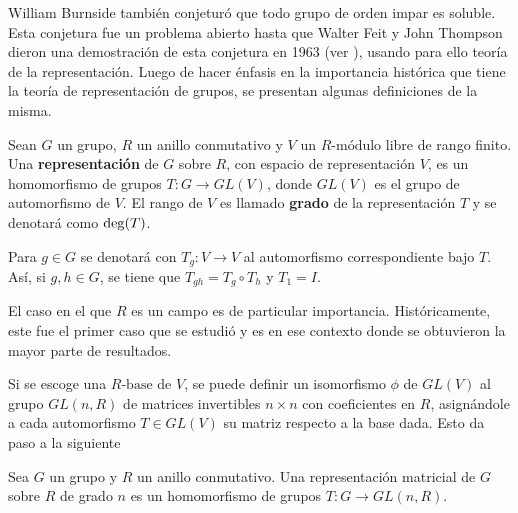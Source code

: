 William Burnside también conjeturó que todo grupo de orden impar es soluble. Esta conjetura fue un problema abierto hasta que Walter Feit y John Thompson dieron una demostración de esta conjetura en 1963 (ver \cite{bib:solubilidad}), usando para ello teoría de la representación. Luego de hacer énfasis en la importancia histórica que tiene la teoría de representación de grupos, se presentan algunas definiciones de la~ misma.
\begin{definicion}
Sean $G$ un grupo, $R$ un anillo conmutativo y $V$ un $R\mbox{-módulo}$ libre de rango finito. Una \textbf{representación} de $G$ sobre $R$, con espacio de representación $V$, es un homomorfismo de grupos $T \colon G \to GL(V)$, donde $GL(V)$ es el grupo de automorfismo de $V$. El rango de $V$ es llamado \textbf{grado} de la representación $T$ y se denotará como $\operatorname{deg}(T)$.
\end{definicion}

Para $g \in G$ se denotará con $T_g \colon V \to V$ al automorfismo correspondiente bajo $T$. Así, si $g, h \in G$, se tiene que $T_{gh} = T_g \circ T_h$ y $T_1 = I$.

El caso en el que $R$ es un campo es de particular importancia. Históricamente, este fue el primer caso que se estudió y es en ese contexto donde se obtuvieron la mayor parte de resultados. 

Si se escoge una $R\mbox{-base}$ de $V$, se puede definir un isomorfismo $\phi$ de $GL(V)$ al grupo $GL(n,R)$ de matrices invertibles $n\times n$ con coeficientes en $R$, asignándole a cada automorfismo $T \in GL(V)$ su matriz respecto a la base dada. Esto da paso a la siguiente

\begin{definicion}
Sea $G$ un grupo y $R$ un anillo conmutativo. Una representación matricial de $G$ sobre $R$ de grado $n$ es un homomorfismo de grupos $T \colon G \to GL(n,R)$.
\end{definicion} 

